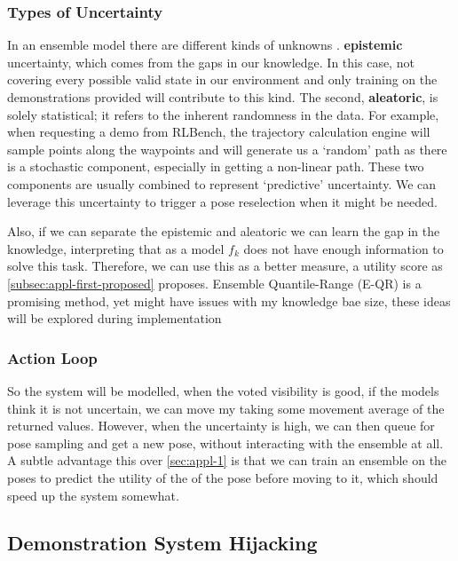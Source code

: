 \subsubsection{Types of Uncertainty}
In an ensemble model there are different kinds of unknowns \cite{Gal2016Uncertainty, H_llermeier_2021, valdenegrotoro2022deeperlookaleatoricepistemic}. \textbf{epistemic} uncertainty, which comes from the gaps in our knowledge. In this case, not covering every possible valid state in our environment and only training on the demonstrations provided will contribute to this kind. The second, \textbf{aleatoric}, is solely statistical; it refers to the inherent randomness in the data. For example, when requesting a demo from RLBench, the trajectory calculation engine will sample points along the waypoints and will generate us a `random' path as there is a stochastic component, especially in getting a non-linear path. These two components are usually combined to represent `predictive' uncertainty. We can leverage this uncertainty to trigger a pose reselection when it might be needed.

Also, if we can separate the epistemic and aleatoric we can learn the gap in the knowledge, interpreting that as a model $f_k$ does not have enough information to solve this task. Therefore, we can use this as a better measure, a utility score as \ref{subsec:appl-first-proposed} proposes. Ensemble Quantile-Range (E-QR) \cite{ansari2024eqr} is a promising method, yet might have issues with my  knowledge bae size, these ideas will be explored during implementation

\subsubsection{Action Loop}
So the system will be modelled, when the voted visibility is good, if the models think it is not uncertain, we can move my taking some movement average of the returned values. However, when the uncertainty is high, we can then queue for pose sampling and get a new pose, without interacting with the ensemble at all. A subtle advantage this over \ref{sec:appl-1} is that we can train an ensemble on the poses to predict the utility of the of the pose before moving to it, which should speed up the system somewhat.

\subsection{Demonstration System Hijacking}

